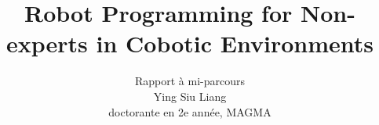 \title{Robot Programming for Non-experts in Cobotic Environments}
\author{Rapport \`{a} mi-parcours\\Ying Siu Liang\\doctorante en 2e année, MAGMA}

%
